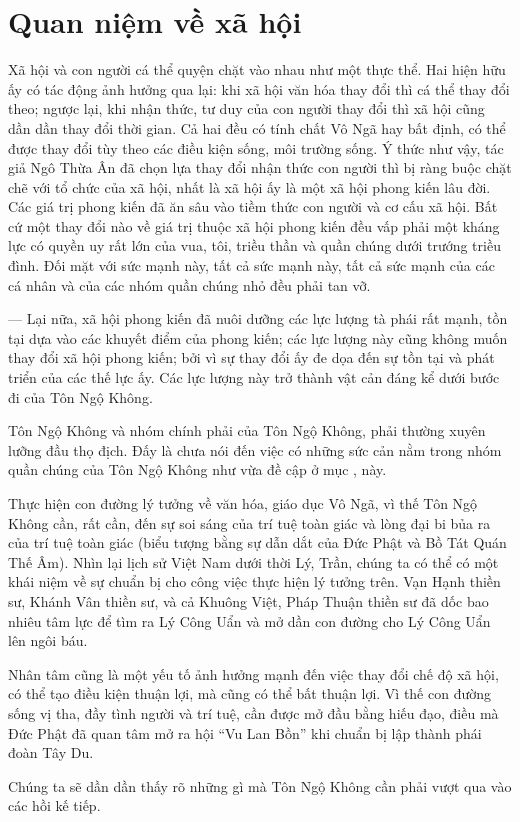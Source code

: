 
\section{Quan niệm về xã hội} %
\label{sec:8_xa_hoi}

Xã hội và con người cá thể quyện chặt vào nhau như một thực thể. Hai hiện hữu ấy có tác động ảnh hưởng qua lại: khi xã hội văn hóa thay đổi thì cá thể thay đổi theo; ngược lại, khi nhận thức, tư duy của con người thay đổi thì xã hội cũng dần dần thay đổi thời gian. Cả hai đều có tính chất Vô Ngã hay bất định, có thể được thay đổi tùy theo các điều kiện sống, môi trường sống. Ý thức như vậy, tác giả Ngô Thừa Ân đã chọn lựa thay đổi nhận thức con người thì bị ràng buộc chặt chẽ với tổ chức của xã hội, nhất là xã hội ấy là một xã hội phong kiến lâu đời. Các giá trị phong kiến đã ăn sâu vào tiềm thức con người và cơ cấu xã hội. Bất cứ một thay đổi nào về giá trị thuộc xã hội phong kiến đều vấp phải một kháng lực có quyền uy rất lớn của vua, tôi, triều thần và quần chúng dưới trướng triều đình. Đối mặt với sức mạnh này, tất cả sức mạnh này, tất cả sức mạnh của các cá nhân và của các nhóm quần chúng nhỏ đều phải tan vỡ.

— Lại nữa, xã hội phong kiến đã nuôi dưỡng các lực lượng tà phái rất mạnh, tồn tại dựa vào các khuyết điểm của phong kiến; các lực lượng này cũng không muốn thay đổi xã hội phong kiến; bởi vì sự thay đổi ấy đe dọa đến sự tồn tại và phát triển của các thế lực ấy. Các lực lượng này trở thành vật cản đáng kể dưới bước đi của Tôn Ngộ Không.

Tôn Ngộ Không và nhóm chính phải của Tôn Ngộ Không, phải thường xuyên lưỡng đầu thọ địch. Đấy là chưa nói đến việc có những sức cản nằm trong nhóm quần chúng của Tôn Ngộ Không như vừa đề cập ở mục ,  này.

Thực hiện con đường lý tưởng về văn hóa, giáo dục Vô Ngã, vì thế Tôn Ngộ Không cần, rất cần, đến sự soi sáng của trí tuệ toàn giác và lòng đại bi bủa ra của trí tuệ toàn giác (biểu tượng bằng sự dẫn dắt của Đức Phật và Bồ Tát Quán Thế Âm). Nhìn lại lịch sử Việt Nam dưới thời Lý, Trần, chúng ta có thể có một khái niệm về sự chuẩn bị cho công việc thực hiện lý tưởng trên. Vạn Hạnh thiền sư, Khánh Vân thiền sư, và cả Khuông Việt, Pháp Thuận thiền sư đã dốc bao nhiêu tâm lực để tìm ra Lý Công Uẩn và mở dần con đường cho Lý Công Uẩn lên ngôi báu.

Nhân tâm cũng là một yếu tố ảnh hưởng mạnh đến việc thay đổi chế độ xã hội, có thể tạo điều kiện thuận lợi, mà cũng có thể bất thuận lợi. Vì thế con đường sống vị tha, đầy tình người và trí tuệ, cần được mở đầu bằng hiếu đạo, điều mà Đức Phật đã quan tâm mở ra hội ``Vu Lan Bồn'' khi chuẩn bị lập thành phái đoàn Tây Du.

Chúng ta sẽ dần dần thấy rõ những gì mà Tôn Ngộ Không cần phải vượt qua vào các hồi kế tiếp.


